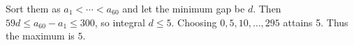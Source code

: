 Sort them as $ a_1<\cdots<a_{60}$ and let the minimum gap be $ d $. Then $ 59d\le a_{60}-a_1\le300 $, so integral $ d\le5 $. Choosing $ 0,5,10,\ldots,295 $ attains 5. Thus the maximum is $\boxed5 $.
